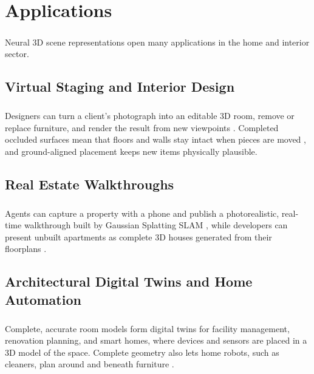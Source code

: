 \documentclass[12pt,a4paper,final]{extreport}
\begin{document}
\chapter{Applications}

\paragraph{} Neural 3D scene representations open many applications in the home and interior sector.

\section{Virtual Staging and Interior Design}

\paragraph{} Designers can turn a client's photograph into an editable 3D room, remove or replace furniture, and render the result from new viewpoints \cite{p1}. Completed occluded surfaces mean that floors and walls stay intact when pieces are moved \cite{p4}, and ground-aligned placement keeps new items physically plausible.

\section{Real Estate Walkthroughs}

\paragraph{} Agents can capture a property with a phone and publish a photorealistic, real-time walkthrough built by Gaussian Splatting SLAM \cite{p3}, while developers can present unbuilt apartments as complete 3D houses generated from their floorplans \cite{p2}.

\section{Architectural Digital Twins and Home Automation}

\paragraph{} Complete, accurate room models form digital twins for facility management, renovation planning, and smart homes, where devices and sensors are placed in a 3D model of the space. Complete geometry also lets home robots, such as cleaners, plan around and beneath furniture \cite{p4}.
\end{document}
